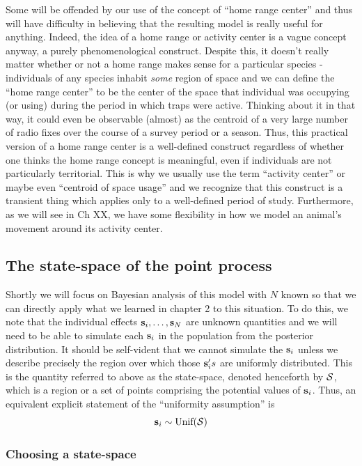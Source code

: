 Some will be offended by our use of the concept of ``home range
center'' and thus will have difficulty in believing that the resulting
model is really useful for anything.  Indeed, the idea of a home range
or activity center is a vague concept anyway, a purely
phenomenological construct.  Despite this, it doesn't really matter
whether or not a home range makes sense for a particular species -
individuals of any species inhabit {\it some} region of space and we
can define the ``home range center'' to be the center of the space
that individual was occupying (or using) during the period in which
traps were active. Thinking about it in that way, it could even be
observable (almost) as the centroid of a very large number of radio
fixes over the course of a survey period or a season.  Thus, this
practical version of a home range center is a well-defined construct
regardless of whether one thinks the home range concept is meaningful,
even if individuals are not particularly territorial.  This is why we
usually use the term ``activity center'' or maybe even ``centroid of
space usage'' and we recognize that this construct is a transient
thing which applies only to a well-defined period of
study. Furthermore, as we will see in Ch XX, we have some flexibility
in how we model an animal's movement around its activity center.


\subsection{The state-space of the point process}
Shortly we will focus on Bayesian analysis of this model with $N$ known
so that we can directly apply what we learned in chapter 2 to this
situation. To do this, we note that the individual effects ${\bf
  s}_{i},\ldots, {\bf s}_{N}$
are unknown quantities and we will need to be able to simulate
each ${\bf s}_{i}$ in the population from the posterior distribution.  It
should be self-vident that we cannot simulate the ${\bf s}_{i}$ unless we
describe precisely the region over which those ${\bf s}_{i}'s$ are uniformly distributed. This is the quantity referred to above as the state-space, denoted henceforth by ${\cal S}$, which is a region or a set of points comprising the potential values of ${\bf s}_{i}$. Thus, an equivalent explicit statement of the ``uniformity assumption'' is
\[
{\bf s}_{i} \sim \mbox{Unif}({\cal S})
\]


\subsubsection{Choosing a state-space}

